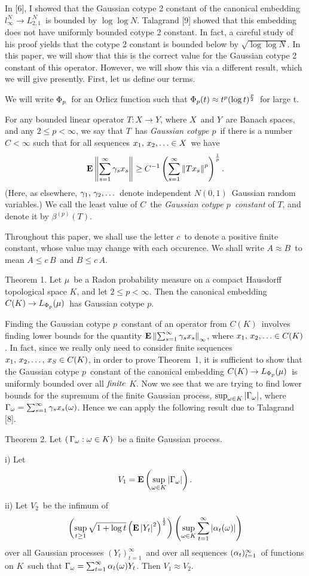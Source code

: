 In [6], I showed that the Gaussian cotype 2 constant of the canonical
embedding $l_\infty^N \to L_{2,1}^N$\ is bounded by $\log\log N$.
Talagrand [9] showed that this embedding does not have uniformly bounded
cotype 2 constant. In fact, a careful study of his proof yields that the
cotype 2 constant is bounded below by $\sqrt{\log\log N}$.
In this paper, we will show that this is the correct value for the
Gaussian cotype 2 constant of this operator.
However, we will show
this via a different result, which we will give presently. First, let us
define our terms.

We will
write ${\Phi_p}$\ for an Orlicz function such that ${\Phi_p}(t) \approx t^p
(\log t)^{p\over2}$\ for large t.

For any bounded linear operator $T: X \to Y$,
where $X$\ and $Y$\ are Banach spaces, and any $2\le p<\infty$, we
say that $T$\ has {\it Gaussian
cotype $p$}\ if there is a number $C<\infty$ such that for all sequences
$\lists x \in X$\ we have
$$ {\bf E} \left\| \sum_{s=1}^\infty \gamma_s x_s \right\|
   \ge C^{-1} \left( \sum_{s=1}^\infty \left\| Tx_s \right\|^p \right)^{1\over p} .$$
(Here, as elsewhere, $\lists \gamma$\ denote independent $N(0,1)$\
Gaussian random variables.)
We call the least value of $C$\ the {\it Gaussian cotype $p$\ constant}
of $T$, and denote it by $\beta^{(p)}(T)$.

Throughout this paper, we shall use the letter $c$\ to denote a positive
finite constant, whose value may change with each occurence. We
shall write $A \approx B$\ to mean $A \le c\,B$\ and $B \le c\,A$.

\proclaim Theorem 1. Let $\mu$\ be a Radon probability measure on a
compact Hausdorff
topological space $K$, and let $2\le p<\infty$. Then the canonical
embedding $C(K) \to {L_{\Phi_p}} (\mu)$\ has Gaussian cotype $p$.


Finding the Gaussian cotype $p$\ constant of an operator from $C(K)$\
involves finding lower bounds for the quantity ${\bf E}\left\| \sum_{s=1}^\infty \gamma_s x_s \right\|_\infty$, where
$\lists x\in C(K)$. In fact, since we really only need to consider
finite
sequences $\list xS \in C(K)$, in order to prove Theorem~1, it is
sufficient to show that
the Gaussian cotype $p$\ constant of the canonical embedding $C(K) \to
{L_{\Phi_p}}(\mu)$\ is uniformly bounded over all $\it finite\/$ $K$. Now we
see that we are trying to find lower bounds for the supremum of the
finite Gaussian process, $\sup_{\omega\in K} \left| \Gamma_\omega \right|$, where $\Gamma_\omega =
\sum_{s=1}^\infty \gamma_s x_s(\omega) $. Hence we can apply the following result due to
Talagrand [8].

\proclaim Theorem 2. Let $(\,\Gamma_\omega:\omega\in K)$\ be a finite
Gaussian process.
\item{i)} Let
$$ V_1 = {\bf E}\left(\sup_{\omega\in K} \left| \Gamma_\omega \right|\right) .$$
\item{ii)} Let $V_2$\ be the infimum of
$$ \left( \sup_{t\ge1} \sqrt{1+\log t}
   \left({\bf E}\left| Y_t \right|^2\right)^{1\over2}\right)
   \left(\sup_{\omega\in K} \sum_{t=1}^\infty \left| \alpha_t(\omega) \right| \right) $$
over all Gaussian processes $(Y_t)_{t=1}^\infty$\ and over all sequences
$(\alpha_t)_{t=1}^\infty$\ of functions on $K$\ such that
$\Gamma_\omega = \sum_{t=1}^\infty \alpha_t(\omega) Y_t$.
\moreproclaim\noindent
Then $V_1 \approx V_2$.

